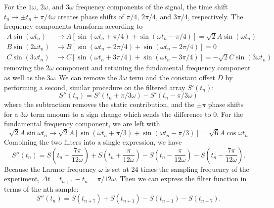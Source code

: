 \documentclass [10pt, twoside] {uwthesis}[2012/04/02]
\begin{document}
For the $1\omega$, $2\omega$, and $3\omega$ frequency components of the signal, the time shift $t_n \rightarrow \pm t_n + \pi/4\omega$ creates phase shifts of $\pi/4$, $2\pi/4$, and $3\pi/4$, respectively. The frequency components transform according to
\begin{align}
A\sin(\omega t_n) & \rightarrow A[\sin(\omega t_n + \pi/4) + \sin(\omega t_n - \pi/4)] = \sqrt{2}A \sin(\omega t_n) \\
B\sin(2\omega t_n)& \rightarrow B[\sin(\omega t_n + 2\pi/4)+ \sin(\omega t_n - 2\pi/4)]= 0\\
C\sin(3\omega t_n)& \rightarrow C[\sin(\omega t_n + 3\pi/4)+ \sin(\omega t_n - 3\pi/4)]= -\sqrt{2}C\sin(3\omega t_n)
\end{align} 
removing the $2\omega$ component and retaining the fundamental frequency component as well as the $3\omega$. We can remove the $3\omega$ term and the constant offset $D$ by performing a second, similar procedure on the filtered array $S'(t_n)$: 
\begin{equation}
S''(t_n) = S'(t_n + \pi/3\omega) - S'(t_n - \pi/3\omega)
\end{equation}
where the subtraction removes the static contribution, and the $\pm\pi$ phase shifts for a $3\omega$ term amount to a sign change which sends the difference to 0. For the fundamental frequency component, we are left with
\begin{equation}
\sqrt{2} A \sin\omega t_n \rightarrow \sqrt{2} A [\sin(\omega t_n + \pi/3) + \sin(\omega t_n - \pi/3)] = \sqrt{6} A \cos\omega t_n 
\end{equation}
Combining the two filters into a single expression, we have
\begin{equation}
S''(t_n) = S(t_n + \dfrac{7\pi}{12\omega}) + S(t_n + \dfrac{\pi}{12\omega}) - S(t_n - \dfrac{\pi}{12\omega}) - S(t_n - \dfrac{7\pi}{12\omega}).
\end{equation}
Because the Larmor frequency $\omega$ is set at 24 times the sampling frequency of the experiment, $\Delta t = t_{n+1} - t_n = \pi/12\omega.$ Then we can express the filter function in terms of the nth sample:
\begin{equation}
S''(t_n) = S(t_{n+7}) + S(t_{n+1}) - S(t_{n-1}) - S(t_{n-7}).
\end{equation}
\end{document}
